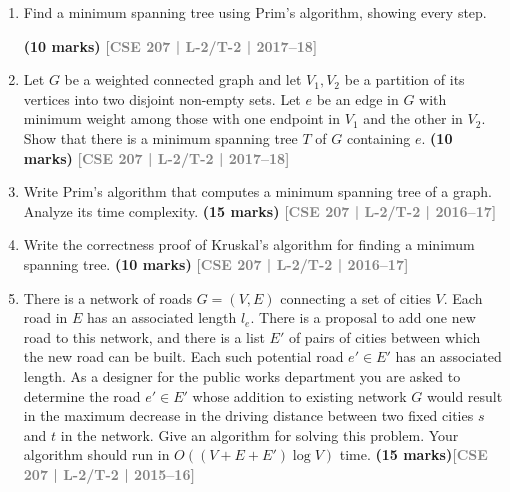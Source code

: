 \documentclass[12pt]{article}
\newcommand{\yr}[1]{\hfill\textcolor{gray}{\small\textbf{[#1]}}}
\newcommand{\mk}[1]{\textcolor{orange!70!black}{\small\textbf{(#1 marks)}}}
\begin{document}
\begin{enumerate}
\item Find a minimum spanning tree using Prim's algorithm, showing every step.

\begin{center}

\end{center}
\mk{10} \yr{CSE 207 | L-2/T-2 | 2017--18}



\item Let $G$ be a weighted connected graph and let $V_1, V_2$ be a partition of its vertices into two disjoint non-empty sets. Let $e$ be an edge in $G$ with minimum weight among those with one endpoint in $V_1$ and the other in $V_2$. Show that there is a minimum spanning tree $T$ of $G$ containing $e$. \mk{10}
\yr{CSE 207 | L-2/T-2 | 2017--18}


\item Write Prim's algorithm that computes a minimum spanning tree of a graph. Analyze its time complexity. \mk{15}
\yr{CSE 207 | L-2/T-2 | 2016--17}


\item Write the correctness proof of Kruskal's algorithm for finding a minimum spanning tree. \mk{10}
\yr{CSE 207 | L-2/T-2 | 2016--17}


\item There is a network of roads $G = (V, E)$ connecting a set of cities $V$.
Each road in $E$ has an associated length $l_e$. There is a proposal to add one
new road to this network, and there is a list $E'$ of pairs of cities between
which the new road can be built. Each such potential road $e' \in E'$ has an
associated length. As a designer for the public works department you are asked
to determine the road $e' \in E'$ whose addition to existing network $G$ would
result in the maximum decrease in the driving distance between two fixed cities
$s$ and $t$ in the network. Give an algorithm for solving this problem. Your
algorithm should run in $O((V + E + E') \log V)$ time.
 \mk{15}\yr{CSE 207 | L-2/T-2 | 2015--16}



\end{enumerate}
\end{document}

